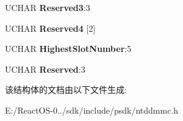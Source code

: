 \begin{DoxyCompactItemize}
\mbox{\label{struct___f_e_a_t_u_r_e___d_a_t_a___e_m_b_e_d_d_e_d___c_h_a_n_g_e_r_a55b725dcb784c9386393097492c383a9}} 
U\+C\+H\+AR {\bfseries Reserved3}\+:3
\item 
\mbox{\label{struct___f_e_a_t_u_r_e___d_a_t_a___e_m_b_e_d_d_e_d___c_h_a_n_g_e_r_a2a466c15b7095ac3be7e2511e7166dfd}} 
U\+C\+H\+AR {\bfseries Reserved4} \mbox{[}2\mbox{]}
\item 
\mbox{\label{struct___f_e_a_t_u_r_e___d_a_t_a___e_m_b_e_d_d_e_d___c_h_a_n_g_e_r_a0c37485b485d309ce68e4fbc4c7b3d59}} 
U\+C\+H\+AR {\bfseries Highest\+Slot\+Number}\+:5
\item 
\mbox{\label{struct___f_e_a_t_u_r_e___d_a_t_a___e_m_b_e_d_d_e_d___c_h_a_n_g_e_r_ac3fde617dd1bab7fe0308ce4bada6a82}} 
U\+C\+H\+AR {\bfseries Reserved}\+:3
\end{DoxyCompactItemize}


该结构体的文档由以下文件生成\+:\begin{DoxyCompactItemize}
\item 
E\+:/\+React\+O\+S-\/0../sdk/include/psdk/ntddmmc.\+h\end{DoxyCompactItemize}
